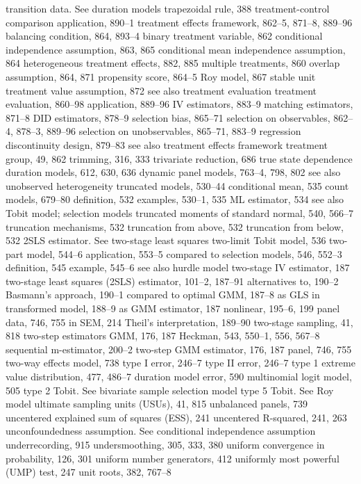 transition data. See duration models trapezoidal rule, 388 treatment-control comparison
application, 890–1
treatment effects framework, 862–5, 871–8, 889–96
balancing condition, 864, 893–4
binary treatment variable, 862
conditional independence assumption, 863, 865 conditional mean independence assumption, 864 heterogeneous treatment effects, 882, 885 multiple treatments, 860
overlap assumption, 864, 871
propensity score, 864–5
Roy model, 867
stable unit treatment value assumption, 872
see also treatment evaluation
treatment evaluation, 860–98
application, 889–96
IV estimators, 883–9
matching estimators, 871–8
DID estimators, 878–9
selection bias, 865–71
selection on observables, 862–4, 878–3, 889–96 selection on unobservables, 865–71, 883–9 regression discontinuity design, 879–83
see also treatment effects framework treatment group, 49, 862
trimming, 316, 333
trivariate reduction, 686
true state dependence
duration models, 612, 630, 636 dynamic panel models, 763–4, 798, 802 see also unobserved heterogeneity
truncated models, 530–44 conditional mean, 535 count models, 679–80 definition, 532 examples, 530–1, 535 ML estimator, 534
see also Tobit model; selection models truncated moments of standard normal, 540, 566–7 truncation mechanisms, 532
truncation from above, 532
truncation from below, 532
2SLS estimator. See two-stage least squares two-limit Tobit model, 536
two-part model, 544–6
application, 553–5
compared to selection models, 546, 552–3 definition, 545
example, 545–6
see also hurdle model
two-stage IV estimator, 187
two-stage least squares (2SLS) estimator, 101–2,
187–91
alternatives to, 190–2
Basmann’s approach, 190–1 compared to optimal GMM, 187–8
as GLS in transformed model, 188–9 as GMM estimator, 187
nonlinear, 195–6, 199
panel data, 746, 755
in SEM, 214
Theil’s interpretation, 189–90 two-stage sampling, 41, 818 two-step estimators
GMM, 176, 187
Heckman, 543, 550–1, 556, 567–8 sequential m-estimator, 200–2
two-step GMM estimator, 176, 187 panel, 746, 755
two-way effects model, 738
type I error, 246–7
type II error, 246–7
type 1 extreme value distribution, 477, 486–7
duration model error, 590
multinomial logit model, 505
type 2 Tobit. See bivariate sample selection model type 5 Tobit. See Roy model
ultimate sampling units (USUs), 41, 815 unbalanced panels, 739
uncentered explained sum of squares (ESS), 241 uncentered R-squared, 241, 263 unconfoundedness assumption. See conditional
independence assumption underrecording, 915
undersmoothing, 305, 333, 380
uniform convergence in probability, 126, 301 uniform number generators, 412
uniformly most powerful (UMP) test, 247 unit roots, 382, 767–8
